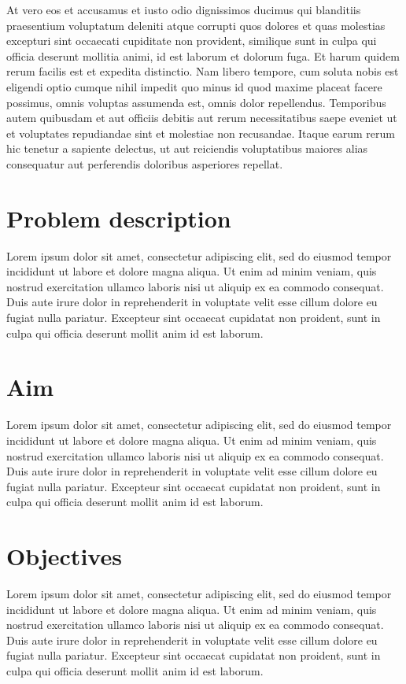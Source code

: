 \documentclass[11pt]{report}
\begin{document}
At vero eos et accusamus et iusto odio dignissimos ducimus qui blanditiis praesentium voluptatum deleniti atque corrupti quos dolores et quas molestias excepturi sint occaecati cupiditate non provident, similique sunt in culpa qui officia deserunt mollitia animi, id est laborum et dolorum fuga. Et harum quidem rerum facilis est et expedita distinctio. Nam libero tempore, cum soluta nobis est eligendi optio cumque nihil impedit quo minus id quod maxime placeat facere possimus, omnis voluptas assumenda est, omnis dolor repellendus. Temporibus autem quibusdam et aut officiis debitis aut rerum necessitatibus saepe eveniet ut et voluptates repudiandae sint et molestiae non recusandae. Itaque earum rerum hic tenetur a sapiente delectus, ut aut reiciendis voluptatibus maiores alias consequatur aut perferendis doloribus asperiores repellat.

\section{Problem description}

Lorem ipsum dolor sit amet, consectetur adipiscing elit, sed do eiusmod tempor incididunt ut labore et dolore magna aliqua. Ut enim ad minim veniam, quis nostrud exercitation ullamco laboris nisi ut aliquip ex ea commodo consequat. Duis aute irure dolor in reprehenderit in voluptate velit esse cillum dolore eu fugiat nulla pariatur. Excepteur sint occaecat cupidatat non proident, sunt in culpa qui officia deserunt mollit anim id est laborum.

\section{Aim}

Lorem ipsum dolor sit amet, consectetur adipiscing elit, sed do eiusmod tempor incididunt ut labore et dolore magna aliqua. Ut enim ad minim veniam, quis nostrud exercitation ullamco laboris nisi ut aliquip ex ea commodo consequat. Duis aute irure dolor in reprehenderit in voluptate velit esse cillum dolore eu fugiat nulla pariatur. Excepteur sint occaecat cupidatat non proident, sunt in culpa qui officia deserunt mollit anim id est laborum.

\section{Objectives}

Lorem ipsum dolor sit amet, consectetur adipiscing elit, sed do eiusmod tempor incididunt ut labore et dolore magna aliqua. Ut enim ad minim veniam, quis nostrud exercitation ullamco laboris nisi ut aliquip ex ea commodo consequat. Duis aute irure dolor in reprehenderit in voluptate velit esse cillum dolore eu fugiat nulla pariatur. Excepteur sint occaecat cupidatat non proident, sunt in culpa qui officia deserunt mollit anim id est laborum.
\end{document}
